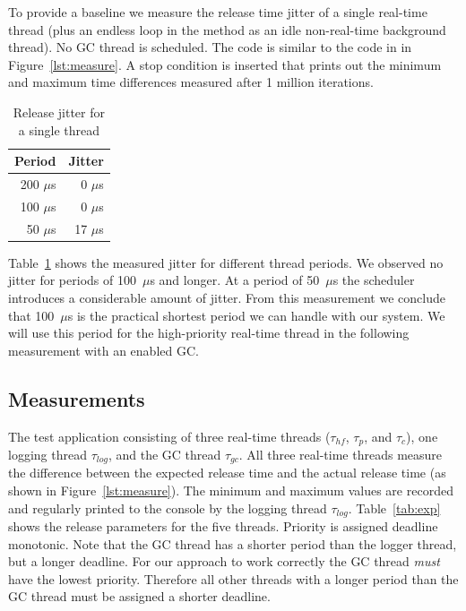 To provide a baseline we measure the release time jitter of a single
real-time thread (plus an endless loop in the  method as
an idle non-real-time background thread). No GC thread is scheduled.
The code is similar to the code in in Figure~\ref{lst:measure}. A
stop condition is inserted that prints out the minimum and maximum
time differences measured after 1 million iterations.

\begin{table}
    \centering
    \begin{tabular}{rr}
    \toprule
    Period & Jitter \\
    \midrule
    200 $\mu$s & 0 $\mu$s \\
    100 $\mu$s & 0 $\mu$s \\
    50 $\mu$s & 17 $\mu$s \\
    \bottomrule
    \end{tabular}
    \caption{Release jitter for a single thread}
    \label{tab:single}
\end{table}

Table~\ref{tab:single} shows the measured jitter for different
thread periods. We observed no jitter for periods of 100~$\mu$s and
longer. At a period of 50~$\mu$s the scheduler introduces a
considerable amount of jitter. From this measurement we conclude
that 100~$\mu$s is the practical shortest period we can handle with
our system. We will use this period for the high-priority real-time
thread in the following measurement with an enabled GC.

\subsection{Measurements}

The test application consisting of three real-time threads
($\tau_{hf}$, $\tau_{p}$, and $\tau_{c}$), one logging thread
$\tau_{log}$, and the GC thread $\tau_{gc}$. All three real-time
threads measure the difference between the expected release time and
the actual release time (as shown in Figure~\ref{lst:measure}). The
minimum and maximum values are recorded and regularly printed to the
console by the logging thread $\tau_{log}$. Table~\ref{tab:exp}
shows the release parameters for the five threads. Priority is
assigned deadline monotonic. Note that the GC thread has a shorter
period than the logger thread, but a longer deadline. For our
approach to work correctly the GC thread \emph{must} have the lowest
priority. Therefore all other threads with a longer period than the
GC thread must be assigned a shorter deadline.


